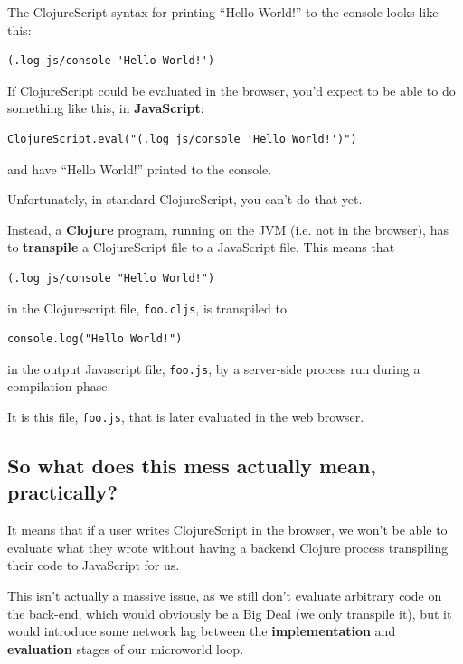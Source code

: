 The ClojureScript syntax for printing ``Hello World!'' to the console
looks like this: 

\begin{verbatim}
(.log js/console 'Hello World!')
\end{verbatim}

If ClojureScript could be evaluated in the browser, you'd expect to be
able to do something like this, in \textbf{JavaScript}: 

\begin{verbatim}
ClojureScript.eval("(.log js/console 'Hello World!')") 
\end{verbatim}

and have ``Hello World!'' printed to the console.

Unfortunately, in standard ClojureScript, you can't do that yet.

Instead, a \textbf{Clojure} program, running on the JVM (i.e. not in the browser), has to \textbf{transpile} a ClojureScript file to a
JavaScript file. This means that 

\begin{verbatim}
(.log js/console "Hello World!")
\end{verbatim}

in the Clojurescript file, \texttt{foo.cljs}, is transpiled to

\begin{verbatim}
console.log("Hello World!")
\end{verbatim}

in the output Javascript file, \texttt{foo.js}, by a server-side process run during a compilation phase. 

It is this file, \texttt{foo.js}, that is later evaluated in the web browser.

\subsection{So what does this mess actually mean, practically?}

It means that if a user writes ClojureScript in the browser, we won't be
able to evaluate what they wrote without having a backend Clojure
process transpiling their code to JavaScript for us.

This isn't actually a massive issue, as we still don't evaluate
arbitrary code on the back-end, which would obviously be a Big Deal (we
only transpile it), but it would introduce some network lag
between the \textbf{implementation} and \textbf{evaluation} stages of
our microworld loop.

